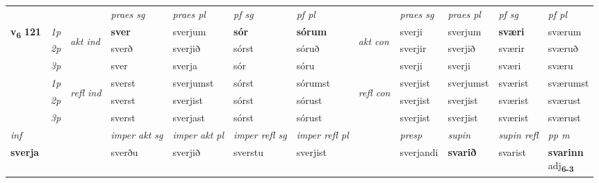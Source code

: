 \begin{longtable}[l]{X>{\footnotesize\itshape}llXXXXlXXXX}
 & &   & \textit{praes sg}  & \textit{praes pl}    & \textit{ pf sg} & \textit{pf pl} & & \textit{praes sg}  & \textit{praes pl}    & \textit{pf sg} & \textit{pf pl }  \\ \cmidrule{4-7} \cmidrule{9-12}
 \multirow{2}{*}{{{\textbf{v{\textsubscript{6}}} \Large{\textbf{121}}}}}  & 1p & \multirow{3}{*}{\begin{turn}{90}\textit{akt ind}\end{turn}} & \textbf{sver} & sverjum & \textbf{sór} & \textbf{sórum} & \multirow{3}{*}{\begin{turn}{90}\textit{akt con}\end{turn}} &sverji & sverjum & \textbf{sværi} & sværum\\*
 & 2p &  &  sverð  & sverjið & sórst & sóruð & & sverjir & sverjið & sværir & sværuð \\*
 & 3p &  & sver & sverja & sór & sóru & & sverji & sverji& sværi & sværu \\*
\cmidrule{4-7} \cmidrule{9-12}
 & 1p & \multirow{3}{*}{\begin{turn}{90}\textit{refl ind}\end{turn}}  & sverst & sverjumst & sórst & sórumst & \multirow{3}{*}{\begin{turn}{90}\textit{refl con}\end{turn}}  &sverjist & sverjumst & sværist & sværumst \\*
 & 2p &  & sverst & sverjist & sórst & sórust & &sverjist & sverjist & sværist & sværust \\*
 & 3p  & & sverst & sverjast & sórst & sórust & & sverjist & sverjist& sværist & sværust \\*
\cmidrule{4-7} \cmidrule{9-12}

   {\textit{inf}} & &  & \textit{imper akt sg} & \textit{imper akt pl} & \textit{imper refl sg} & \textit{imper refl pl} && \textit{presp} & \textit{supin} & \textit{supin refl} & \textit{pp m} \\*
  {\textbf{sverja}} & && sverðu  & sverjið & sverstu & sverjist && sverjandi &  \textbf{svarið} & svarist & \specialcell{\textbf{svarinn} \\ adj\textbf{\textsubscript{6-3}}} \\*

\midrule


\end{longtable}
